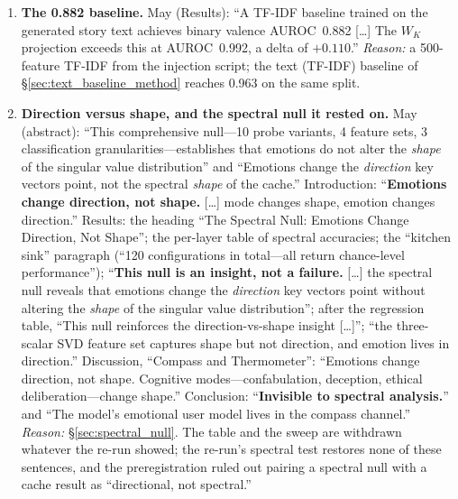 \begin{enumerate}[leftmargin=*]
    \item \label{app:item:tfidf}\textbf{The 0.882 baseline.} May (Results): ``A TF-IDF baseline trained on the generated story text achieves binary valence AUROC~0.882 [\ldots] The $W_K$ projection exceeds this at AUROC~0.992, a delta of $+0.110$.'' \emph{Reason:} a 500-feature TF-IDF from the injection script; the text (TF-IDF) baseline of \S\ref{sec:text_baseline_method} reaches 0.963 on the same split.

    \item \label{app:item:shape}\textbf{Direction versus shape, and the spectral null it rested on.} May (abstract): ``This comprehensive null---10 probe variants, 4 feature sets, 3 classification granularities---establishes that emotions do not alter the \emph{shape} of the singular value distribution'' and ``Emotions change the \emph{direction} key vectors point, not the spectral \emph{shape} of the cache.'' Introduction: ``\textbf{Emotions change direction, not shape.} [\ldots] mode changes shape, emotion changes direction.'' Results: the heading ``The Spectral Null: Emotions Change Direction, Not Shape''; the per-layer table of spectral accuracies; the ``kitchen sink'' paragraph (``120 configurations in total---all return chance-level performance''); ``\textbf{This null is an insight, not a failure.} [\ldots] the spectral null reveals that emotions change the \emph{direction} key vectors point without altering the \emph{shape} of the singular value distribution''; after the regression table, ``This null reinforces the direction-vs-shape insight [\ldots]''; ``the three-scalar SVD feature set captures shape but not direction, and emotion lives in direction.'' Discussion, ``Compass and Thermometer'': ``Emotions change direction, not shape. Cognitive modes---confabulation, deception, ethical deliberation---change shape.'' Conclusion: ``\textbf{Invisible to spectral analysis.}'' and ``The model's emotional user model lives in the compass channel.'' \emph{Reason:} \S\ref{sec:spectral_null}. The table and the sweep are withdrawn whatever the re-run showed; the re-run's spectral test restores none of these sentences, and the preregistration ruled out pairing a spectral null with a cache result as ``directional, not spectral.''


\end{enumerate}
